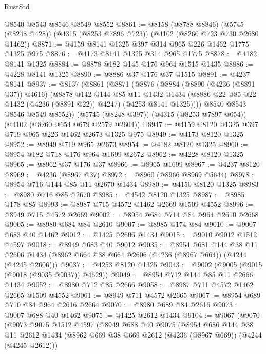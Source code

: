 \begin{lexlean}{RustStd}
\begin{coremodule}
    @8540
    @8543
    @8546
    @8549
    @8552
@8861 := @8158
    (@8788 @8846)
    (@5745 (@8248 @428))
    (@4315 (@8253 @7896 @723))
    (@4102 (@8260 @723 @730 @2680 @1462))
@8871 := @4159 @8141 @1325 @397 @314 @965 @226 @1462 @1775 @1325 @975
@8876 := @4173 @8141 @1325 @314 @965 @1775
@8878 := @4182 @8141 @1325
@8884 := @8878 @182 @145 @176 @964 @1515 @1435
@8886 := @4228 @8141 @1325
@8890 := @8886 @37 @176 @37 @1515
@8891 := @4237 @8141
@8937 := @8137
    (@8861
      (@8871
        (@8876
          (@8884
            (@8890 (@4236 (@8891 @37)) @4616)
            (@8878
              @142
              @144
              @85
              @11
              @1432
              @1434
              (@8886 @22 @85 @22 @1432 (@4236 (@8891 @22)) @4247)
              (@4253 @8141 @1325))))
        @8540
        @8543
        @8546
        @8549
        @8552))
    (@5745 (@8248 @397))
    (@4315 (@8253 @7897 @654))
    (@4102 (@8260 @654 @679 @2579 @2604))
@8947 := @4159 @8120 @1325 @397 @719 @965 @226 @1462 @2673 @1325 @975
@8949 := @4173 @8120 @1325
@8952 := @8949 @719 @965 @2673
@8954 := @4182 @8120 @1325
@8960 := @8954 @182 @718 @176 @964 @1699 @2672
@8962 := @4228 @8120 @1325
@8965 := @8962 @37 @176 @37
@8966 := @8965 @1699
@8967 := @4237 @8120
@8969 := @4236 (@8967 @37)
@8972 := @8960 (@8966 @8969 @5644)
@8978 := @8954 @716 @144 @85 @11 @2670 @1434
@8980 := @4150 @8120 @1325
@8983 := @8980 @716 @85 @2670
@8985 := @4542 @8120 @1325
@8987 := @8985 @178 @85
@8993 := @8987 @715 @4572 @1462 @2669 @1509 @4552
@8996 := @8949 @715 @4572 @2669
@9002 := @8954 @684 @714 @84 @964 @2610 @2668
@9005 := @8980 @684 @84 @2610
@9007 := @8985 @174 @84
@9010 := @9007 @683 @40 @1462
@9012 := @1425 @2606 @1434
@9015 := @9010 @9012 @1512 @4597
@9018 := @8949 @683 @40 @9012
@9035 := @8954
    @681
    @144
    @38
    @11
    @2606
    @1434
    (@8962 @664 @38 @664 @2606 (@4236 (@8967 @664)) (@4244 (@4245 @2606)))
@9037 := @4253 @8120 @1325
@9043 := @9002 (@9005 (@9015 (@9018 (@9035 @9037)) @4629))
@9049 := @8954 @712 @144 @85 @11 @2666 @1434
@9052 := @8980 @712 @85 @2666
@9058 := @8987 @711 @4572 @1462 @2665 @1509 @4552
@9061 := @8949 @711 @4572 @2665
@9067 := @8954 @689 @710 @84 @964 @2616 @2664
@9070 := @8980 @689 @84 @2616
@9073 := @9007 @688 @40 @1462
@9075 := @1425 @2612 @1434
@9104 := @9067
    (@9070
      (@9073
        @9075
        @1512
        @4597
        (@8949
          @688
          @40
          @9075
          (@8954
            @686
            @144
            @38
            @11
            @2612
            @1434
            (@8962 @669 @38 @669 @2612 (@4236 (@8967 @669)) (@4244 (@4245 @2612)))

\end{coremodule}
\end{lexlean}
